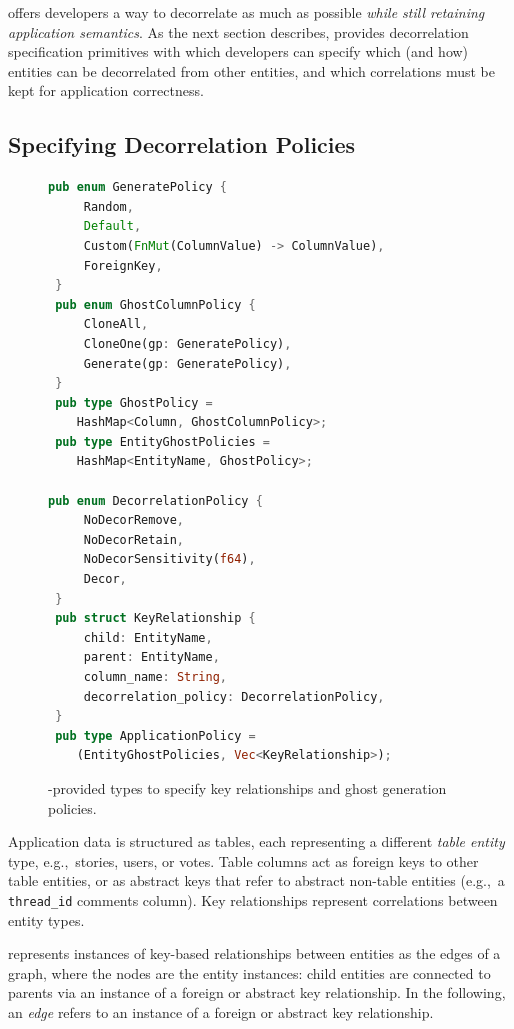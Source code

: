 \sys{} offers developers a way to decorrelate as much as possible \emph{while still retaining
application semantics}. As the next section describes, \sys{} provides decorrelation specification
primitives with which developers can specify which (and how) entities can be decorrelated from other
entities, and which correlations must be kept for application correctness.

\subsection{Specifying Decorrelation Policies}

\begin{figure}
\begin{lstlisting}[language=Rust]
 pub enum GeneratePolicy {
     Random,
     Default,
     Custom(FnMut(ColumnValue) -> ColumnValue),
     ForeignKey, 
 }
 pub enum GhostColumnPolicy {
     CloneAll,
     CloneOne(gp: GeneratePolicy),
     Generate(gp: GeneratePolicy),
 }
 pub type GhostPolicy = 
    HashMap<Column, GhostColumnPolicy>;
 pub type EntityGhostPolicies = 
    HashMap<EntityName, GhostPolicy>;

pub enum DecorrelationPolicy {
     NoDecorRemove,
     NoDecorRetain,
     NoDecorSensitivity(f64),
     Decor,
 }
 pub struct KeyRelationship {
     child: EntityName,
     parent: EntityName,
     column_name: String,
     decorrelation_policy: DecorrelationPolicy,
 }
 pub type ApplicationPolicy = 
    (EntityGhostPolicies, Vec<KeyRelationship>);
\end{lstlisting}
    \caption{\sys{}-provided types to specify key relationships and ghost generation policies.
    }
\end{figure}

Application data is structured as tables, each representing a different \emph{table entity} type,
e.g.,\ stories, users, or votes. Table columns act as foreign keys to other table entities, or as
abstract keys that refer to abstract non-table entities (e.g.,\ a \texttt{thread\_id} comments column). 
Key relationships represent correlations between entity types.

\sys{} represents instances of key-based relationships between entities as the edges of a graph,
where the nodes are the entity instances: child entities are connected to parents via an instance of
a foreign or abstract key relationship. In the following, an \emph{edge} refers to an instance of a
foreign or abstract key relationship.


